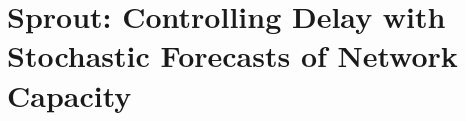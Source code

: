 \chapter{Sprout: Controlling Delay with Stochastic Forecasts of Network Capacity}
\label{chap:sprout}

%




%






